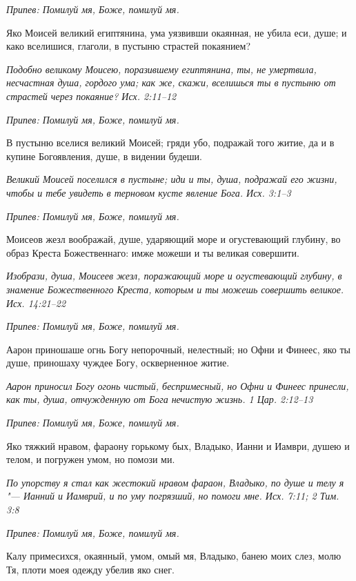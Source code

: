 \itshape Припев:\normalfont{} Помилуй мя, Боже, помилуй мя.


Яко Моисей великий египтянина, ума уязвивши окаянная, не убила еси, душе; и како вселишися, глаголи, в пустыню страстей покаянием?


\itshape Подобно великому Моисею, поразившему египтянина, ты, не умертвила, несчастная душа, гордого ума; как же, скажи, вселишься ты в пустыню от страстей через покаяние? Исх. 2:11–12\normalfont{}


\itshape Припев:\normalfont{} Помилуй мя, Боже, помилуй мя.


В пустыню вселися великий Моисей; гряди убо, подражай того житие, да и в купине Богоявления, душе, в видении будеши.


\itshape Великий Моисей поселился в пустыне; иди и ты, душа, подражай его жизни, чтобы и тебе увидеть в терновом кусте явление Бога. Исх. 3:1–3\normalfont{}


\itshape Припев:\normalfont{} Помилуй мя, Боже, помилуй мя.


Моисеов жезл воображай, душе, ударяющий море и огустевающий глубину, во образ Креста Божественнаго: имже можеши и ты великая совершити.


\itshape Изобрази, душа, Моисеев жезл, поражающий море и огустевающий глубину, в знамение Божественного Креста, которым и ты можешь совершить великое. Исх. 14:21–22\normalfont{}


\itshape Припев:\normalfont{} Помилуй мя, Боже, помилуй мя.


Аарон приношаше огнь Богу непорочный, нелестный; но Офни и Финеес, яко ты душе, приношаху чуждее Богу, оскверненное житие.


\itshape Аарон приносил Богу огонь чистый, беспримесный, но Офни и Финеес принесли, как ты, душа, отчужденную от Бога нечистую жизнь. 1 Цар. 2:12–13\normalfont{}


\itshape Припев:\normalfont{} Помилуй мя, Боже, помилуй мя.


Яко тяжкий нравом, фараону горькому бых, Владыко, Ианни и Иамври, душею и телом, и погружен умом, но помози ми.


\itshape По упорству я стал как жестокий нравом фараон, Владыко, по душе и телу я "--- Ианний и Иамврий, и по уму погрязший, но помоги мне. Исх. 7:11; 2 Тим. 3:8\normalfont{}


\itshape Припев:\normalfont{} Помилуй мя, Боже, помилуй мя.


Калу примесихся, окаянный, умом, омый мя, Владыко, банею моих слез, молю Тя, плоти моея одежду убелив яко снег.


